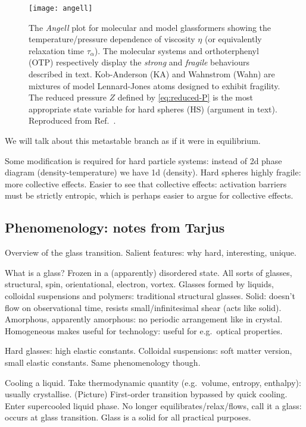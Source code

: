 \begin{SCfigure}
  \texttt{[image: angell]}
  \caption[Angell plot]{
    The \emph{Angell} plot for molecular and model glassformers showing the temperature/pressure dependence of viscosity $\eta$ (or equivalently relaxation time $\tau_\alpha$).
    The molecular systems  and orthoterphenyl (OTP) respectively display the \emph{strong} and \emph{fragile} behaviours described in text.
    Kob-Anderson (KA) and Wahnstrom (Wahn) are mixtures of model Lennard-Jones atoms designed to exhibit fragility.
    The reduced pressure $Z$ defined by \eqref{eq:reduced-P} is the most appropriate state variable for hard spheres (HS) (argument in text).
    Reproduced from Ref.\ \cite{RoyallPR2015}.
  }
\end{SCfigure}

We will talk about this metastable branch as if it were in equilibrium.

Some modification is required for hard particle systems: instead of 2d phase diagram (density-temperature) we have 1d (density).
Hard spheres highly fragile: more collective effects.
Easier to see that collective effects: activation barriers must be strictly entropic, which is perhaps easier to argue for collective effects.

\subsection{Phenomenology: notes from Tarjus}

Overview of the glass transition.
Salient features: why hard, interesting, unique.

What is a glass?
Frozen in a (apparently) disordered state.
All sorts of glasses, structural, spin, orientational, electron, vortex.
Glasses formed by liquids, colloidal suspensions and polymers: traditional structural glasses.
Solid: doesn't flow on observational time, resists small/infinitesimal shear (acts like solid).
Amorphous, apparently amorphous: no periodic arrangement like in crystal.
Homogeneous makes useful for technology: useful for e.g.\ optical properties.

Hard glasses: high elastic constants.
Colloidal suspensions: soft matter version, small elastic constants.
Same phenomenology though.

Cooling a liquid.
Take thermodynamic quantity (e.g.\ volume, entropy, enthalpy): usually crystallise.
(Picture)
First-order transition bypassed by quick cooling.
Enter supercooled liquid phase.
No longer equilibrates/relax/flows, call it a glass: occurs at glass transition.
Glass is a solid for all practical purposes.


